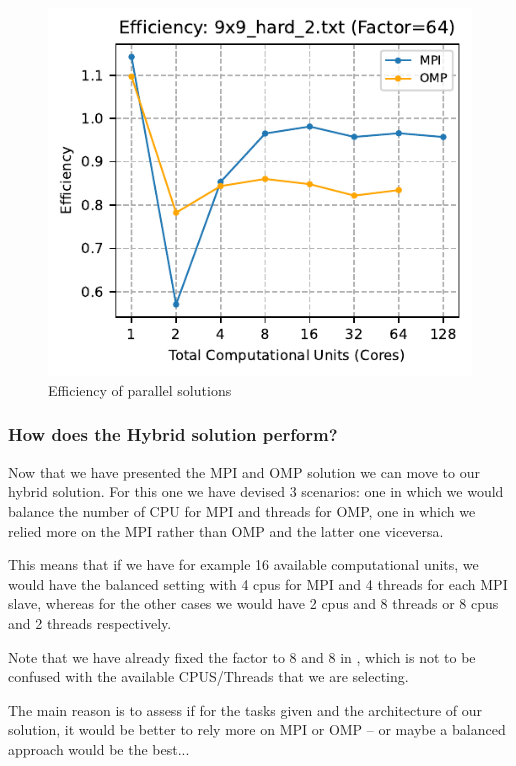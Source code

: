 \begin{figure}[htbp]
\centering
\includegraphics[width=0.9\linewidth]{imgs/efficiency_mpi_omp_9x9_hard_2.pdf}
\caption{Efficiency of parallel solutions}
\label{fig:efficiency_9x9}
\end{figure}


\subsubsection{How does the Hybrid solution perform?}
\label{subsubsec:hybrid_results}

Now that we have presented the MPI and OMP solution we can move to our hybrid solution. For this one we have devised 3 scenarios: one in which we would balance the number of CPU for MPI and threads for OMP, one in which we relied more on the MPI rather than OMP and the latter one viceversa. 

This means that if we have for example 16 available computational units, we would have the balanced setting with 4 cpus for MPI and 4 threads for each MPI slave, whereas for the other cases we would have 2 cpus and 8 threads or 8 cpus and 2 threads respectively. 

Note that we have already fixed the factor to 8 and 8 in , which is not to be confused with the available CPUS/Threads that we are selecting.

The main reason is to assess if for the tasks given and the architecture of our solution, it would be better to rely more on MPI or OMP -- or maybe a balanced approach would be the best...

